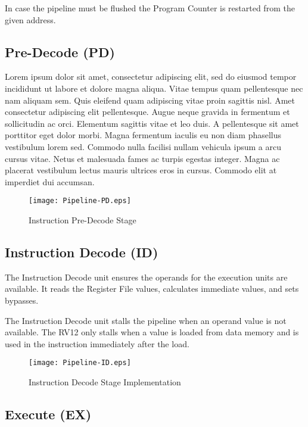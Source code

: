 In case the pipeline must be flushed the Program Counter is restarted
from the given address.

\pagebreak

\subsection{Pre-Decode (PD)}\label{pre-decode-pd}

Lorem ipsum dolor sit amet, consectetur adipiscing elit, sed do eiusmod tempor incididunt ut labore et dolore magna aliqua. Vitae tempus quam pellentesque nec nam aliquam sem. Quis eleifend quam adipiscing vitae proin sagittis nisl. Amet consectetur adipiscing elit pellentesque. Augue neque gravida in fermentum et sollicitudin ac orci. Elementum sagittis vitae et leo duis. A pellentesque sit amet porttitor eget dolor morbi. Magna fermentum iaculis eu non diam phasellus vestibulum lorem sed. Commodo nulla facilisi nullam vehicula ipsum a arcu cursus vitae. Netus et malesuada fames ac turpis egestas integer. Magna ac placerat vestibulum lectus mauris ultrices eros in cursus. Commodo elit at imperdiet dui accumsan. 

\begin{figure}[th]
  \texttt{[image: Pipeline-PD.eps]}
  \caption{Instruction Pre-Decode Stage}
\end{figure}

\pagebreak

\subsection{Instruction Decode (ID)}\label{instruction-decode-id-1}

The Instruction Decode unit ensures the operands for the execution units
are available. It reads the Register File values, calculates immediate
values, and sets bypasses.

The Instruction Decode unit stalls the pipeline when an operand value is
not available. The RV12 only stalls when a value is loaded from data
memory and is used in the instruction immediately after the load.

\begin{figure}[h]
  \texttt{[image: Pipeline-ID.eps]}
  \caption{Instruction Decode Stage Implementation}
\end{figure}

\pagebreak

\subsection{Execute (EX)}\label{execute-ex-1}

